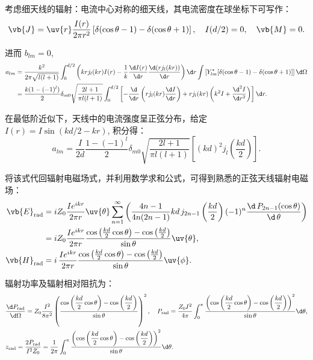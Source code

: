 \begin{example}
	考虑细天线的辐射：电流中心对称的细天线，其电流密度在球坐标下可写作：
	\begin{equation*}
		\vb{J} = \uv{r} \frac{I(r)}{2 \pi r^2}\, [\delta(\cos \theta - 1) - \delta(\cos \theta + 1)]\,, \quad I(d/2) = 0, \quad \vb{M} = 0.
	\end{equation*}

	进而 \(b_{lm} = 0\),
	\begin{align*}
		a_{lm} & = \frac{k^2}{2\pi\sqrt{l(l+1)}} \int_0^{d/2} \left( k r j_l(kr) I(r) - \frac{1}{k} \frac{\d I(r)}{\d r} \frac{\d(r j_l(kr))}{\d r} \right) \d r \int \left[ Y_{lm}^\ast [\delta(\cos\theta - 1) - \delta(\cos\theta + 1)] \right] \d \Omega \\
		       & = \frac{k(1 - (-1)^l)}{2} \delta_{m0} \sqrt{\frac{2l+1}{\pi l(l+1)}} \int_0^{d/2} \left[ -\frac{\d}{\d r}\left( r j_l(kr) \frac{\d I}{\d r} \right) + r j_l(kr) \left( k^2 I + \frac{\d^2 I}{\d r^2} \right) \right] \d r.
	\end{align*}

	在最低阶近似下，天线中的电流强度呈正弦分布，给定 \(I(r) = I \sin(k d/2 - k r)\), 积分得：
	\begin{equation*}
		a_{lm} = \frac{I}{2 d} \frac{1 - (-1)^l}{2} \delta_{m0} \sqrt{\frac{2l+1}{\pi l(l+1)}} \left[ (k d)^2 j_l \left( \frac{k d}{2} \right) \right].
	\end{equation*}

	将该式代回辐射电磁场式，并利用数学求和公式，可得到熟悉的正弦天线辐射电磁场：
	\begin{align*}
		\vb{E}_{\text{rad}} &= i Z_0 \frac{I e^{i k r}}{2 \pi r} \uv{\theta}\sum_{n=1}^\infty \left( \frac{4n-1}{4n(2n-1)} k d \,j_{2n-1} \left( \frac{k d}{2} \right) (-1)^n \frac{\d\, P_{2n-1} (\cos \theta)}{\d\,\theta} \right)
		\\&= i Z_0 \frac{I e^{i k r}}{2 \pi r} \frac{\cos \left( \frac{k d}{2} \cos \theta \right) - \cos \left( \frac{k d}{2} \right)}{\sin \theta} \uv{\theta},\\
		\vb{H}_{\text{rad}} &= i \,\frac{I e^{i k r}}{2 \pi r} \frac{\cos \left( \frac{k d}{2} \cos \theta \right) - \cos \left( \frac{k d}{2} \right)}{\sin \theta} \uv{\phi}.
	\end{align*}

	辐射功率及辐射相对阻抗为：
	\begin{align*}
		&\dfrac{\d  P_{\text{rad}}}{\d  \Omega} = Z_0 \dfrac{I^2}{8 \pi^2} \left( \dfrac{\cos \left( \dfrac{k d}{2} \cos \theta \right) - \cos \left( \dfrac{k d}{2} \right)}{\sin \theta} \right)^2,\quad
		P_{\text{rad}} = \dfrac{Z_0 I^2}{4 \pi} \int_0^\pi \dfrac{\left( \cos \left( \dfrac{k d}{2} \cos \theta \right) - \cos \left( \dfrac{k d}{2} \right) \right)^2}{\sin \theta} \d \theta,\\
		&z_{\text{rad}} = \dfrac{2 P_{\text{rad}}}{I^2 Z_0} = \dfrac{1}{2 \pi} \int_0^\pi \dfrac{\left( \cos \left( \dfrac{k d}{2} \cos \theta \right) - \cos \left( \dfrac{k d}{2} \right) \right)^2}{\sin \theta} \d \theta.
	\end{align*}


\end{example}

